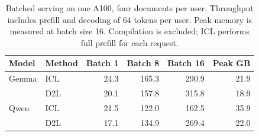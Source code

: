 \begin{table}[t]
\centering
\caption{Batched serving on one A100, four documents per user.
Throughput includes prefill and decoding of 64 tokens per user.
Peak memory is measured at batch size 16. Compilation is excluded;
ICL performs full prefill for each request.}
\label{tab:throughput}
\small\setlength{\tabcolsep}{4pt}
\begin{tabular}{@{}llrrrr@{}}
\toprule
Model & Method & Batch 1 & Batch 8 & Batch 16 & Peak GB \\
\midrule
Gemma & ICL & 24.3 & 165.3 & 290.9 & 21.9 \\
 & D2L & 20.1 & 157.8 & 315.8 & 18.9 \\
Qwen & ICL & 21.5 & 122.0 & 162.5 & 35.9 \\
 & D2L & 17.1 & 134.9 & 269.4 & 22.0 \\
\bottomrule
\end{tabular}
\end{table}
